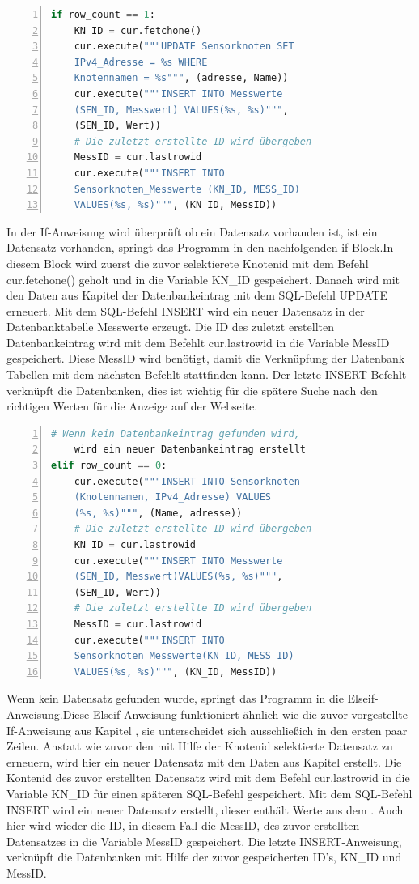 \begin{lstlisting}[caption=If-Anweisung des Befüllen der Datenbank,frame=single,numbers=left,language=Python,showstringspaces=false]
if row_count == 1:
	KN_ID = cur.fetchone()
	cur.execute("""UPDATE Sensorknoten SET
	IPv4_Adresse = %s WHERE
	Knotennamen = %s""", (adresse, Name))
	cur.execute("""INSERT INTO Messwerte 
	(SEN_ID, Messwert) VALUES(%s, %s)""",
	(SEN_ID, Wert))
	# Die zuletzt erstellte ID wird übergeben
	MessID = cur.lastrowid
	cur.execute("""INSERT INTO 
	Sensorknoten_Messwerte (KN_ID, MESS_ID)
	VALUES(%s, %s)""", (KN_ID, MessID))
\end{lstlisting}\label{If-Anweisung}
\noindent In der If-Anweisung wird überprüft ob ein Datensatz vorhanden ist, ist ein Datensatz vorhanden, springt das Programm in den nachfolgenden if Block.In diesem Block wird zuerst die zuvor selektierete Knotenid mit dem Befehl cur.fetchone() geholt und in die Variable KN\_ID gespeichert. Danach wird mit den Daten aus Kapitel  der Datenbankeintrag mit dem SQL-Befehl UPDATE erneuert. Mit dem SQL-Befehl INSERT wird ein neuer Datensatz in der Datenbanktabelle Messwerte erzeugt. Die ID des zuletzt erstellten Datenbankeintrag wird mit dem Befehlt cur.lastrowid in die Variable MessID gespeichert. Diese MessID wird benötigt, damit die Verknüpfung der Datenbank Tabellen mit dem nächsten Befehlt stattfinden kann. Der letzte INSERT-Befehlt verknüpft die Datenbanken, dies ist wichtig für die spätere Suche nach den richtigen Werten für die Anzeige auf der Webseite. 
\begin{lstlisting}[caption=Ifelse-Anweisung des Befüllen der Datenbank,frame=single,numbers=left,language=Python,showstringspaces=false]
	# Wenn kein Datenbankeintrag gefunden wird,
	wird ein neuer Datenbankeintrag erstellt
elif row_count == 0:
	cur.execute("""INSERT INTO Sensorknoten
	(Knotennamen, IPv4_Adresse) VALUES
	(%s, %s)""", (Name, adresse))
	# Die zuletzt erstellte ID wird übergeben
	KN_ID = cur.lastrowid
	cur.execute("""INSERT INTO Messwerte
	(SEN_ID, Messwert)VALUES(%s, %s)""",
	(SEN_ID, Wert))
	# Die zuletzt erstellte ID wird übergeben
	MessID = cur.lastrowid
	cur.execute("""INSERT INTO 
	Sensorknoten_Messwerte(KN_ID, MESS_ID)
	VALUES(%s, %s)""", (KN_ID, MessID))
\end{lstlisting}
\noindent Wenn kein Datensatz gefunden wurde, springt das Programm in die Elseif-Anweisung.Diese Elseif-Anweisung funktioniert ähnlich wie die zuvor vorgestellte If-Anweisung aus Kapitel , sie unterscheidet sich ausschließich in den ersten paar Zeilen. Anstatt wie zuvor den mit Hilfe der Knotenid selektierte Datensatz zu erneuern, wird hier ein neuer Datensatz mit den Daten aus Kapitel  erstellt. Die Kontenid des zuvor erstellten Datensatz wird mit dem Befehl cur.lastrowid in die Variable KN\_ID für einen späteren SQL-Befehl gespeichert. Mit dem SQL-Befehl INSERT wird ein neuer Datensatz erstellt, dieser enthält Werte aus dem . Auch hier wird wieder die ID, in diesem Fall die MessID, des zuvor erstellten Datensatzes in die Variable MessID gespeichert. Die letzte INSERT-Anweisung, verknüpft die Datenbanken mit Hilfe der zuvor gespeicherten ID's, KN\_ID und MessID.   
